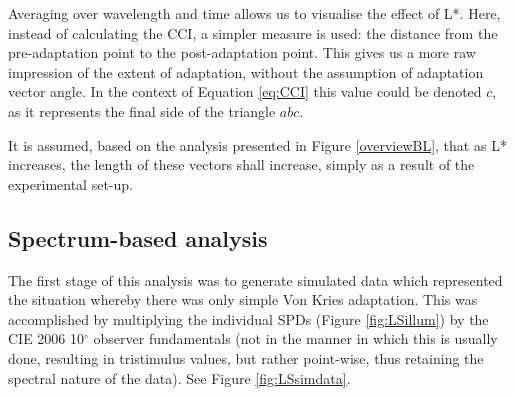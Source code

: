 Averaging over wavelength and time allows us to visualise the effect of L*. Here, instead of calculating the \gls{CCI}, a simpler measure is used: the distance from the pre-adaptation point to the post-adaptation point. This gives us a more raw impression of the extent of adaptation, without the assumption of adaptation vector angle. In the context of Equation \ref{eq:CCI} this value could be denoted $c$, as it represents the final side of the triangle $abc$. 

It is assumed, based on the analysis presented in Figure \ref{overviewBL}, that as L* increases, the length of these vectors shall increase, simply as a result of the experimental set-up.



\subsection{Spectrum-based analysis}


The first stage of this analysis was to generate simulated data which represented the situation whereby there was only simple Von Kries adaptation. This was accomplished by multiplying the individual \glspl{SPD} (Figure \ref{fig:LSillum}) by the CIE 2006 10$^{\circ}$ observer fundamentals (not in the manner in which this is usually done, resulting in tristimulus values, but rather point-wise, thus retaining the spectral nature of the data). See Figure \ref{fig:LSsimdata}.

